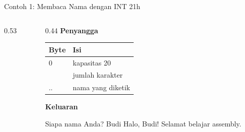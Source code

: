 \documentclass[aspectratio=169,11pt]{beamer}
\begin{document}
\begin{frame}[fragile]{Contoh 1: Membaca Nama dengan INT 21h}
\begin{columns}[t]
\begin{column}{0.53\textwidth}
\end{column}
\begin{column}{0.44\textwidth}
\footnotesize
{\color{obeTeal}\bfseries Penyangga }\\[0.15em]
\begin{tabular}{@{}p{1.2cm}p{4.2cm}@{}}
    \toprule
    \textbf{Byte} & \textbf{Isi} \\
    \midrule
    0 & kapasitas 20 \\
    \addlinespace
    1 & jumlah karakter \\
    \addlinespace
    2.. & nama yang diketik \\
    \bottomrule
\end{tabular}

\vspace{0.25em}
{\color{obeTeal}\bfseries Keluaran}\\[0.15em]
\begin{keluaran}
Siapa nama Anda? Budi
Halo, Budi! Selamat belajar assembly.
\end{keluaran}
\end{column}
\end{columns}
\end{frame}
\end{document}
